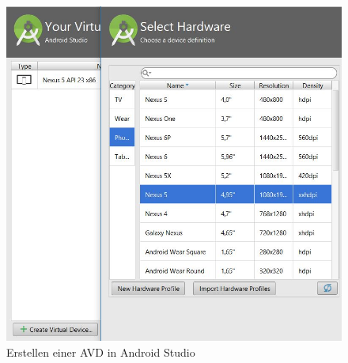 \begin{figure}[!tbp]
	\centering
	\begin{minipage}[b]{0.4\textwidth}
		\includegraphics[width=\textwidth]{images/Create-virtual-device.jpg}
		\caption{Erstellen einer AVD in Android Studio}
	\end{minipage}
	\hfill
	\begin{minipage}[b]{0.4\textwidth}

\end{minipage}
\end{figure}
